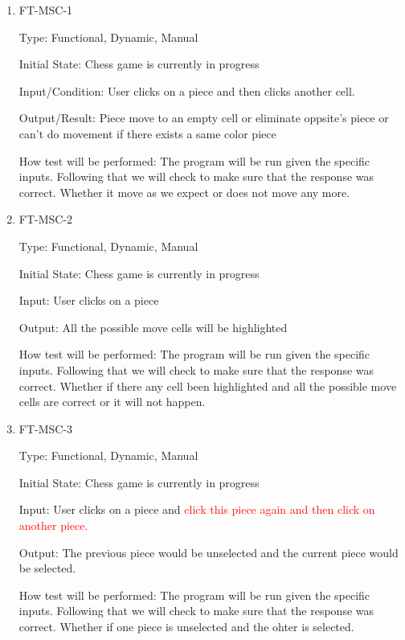 \documentclass[12pt, titlepage]{article}
\begin{document}
\begin{enumerate}

\item{FT-MSC-1\\}

Type: Functional, Dynamic, Manual
					
Initial State: Chess game is currently in progress
					
Input/Condition: User clicks on a piece and then clicks another cell.
					
Output/Result: Piece move to an empty cell or eliminate oppsite's piece or can't do movement if there exists a same color piece
					
How test will be performed: The program will be run given the specific inputs. Following that we will check to make sure that the response was correct. Whether it move as we expect or does not move any more. 
					
\item{FT-MSC-2\\}

Type: Functional, Dynamic, Manual
					
Initial State: Chess game is currently in progress
					
Input: User clicks on a piece
					
Output: All the possible move cells will be highlighted
					
How test will be performed: The program will be run given the specific inputs. Following that we will check to make sure that the response was correct. Whether if there any cell been highlighted and all the possible move cells are correct or it will not happen.

\item{FT-MSC-3\\}

Type: Functional, Dynamic, Manual
					
Initial State: Chess game is currently in progress
					
Input: User clicks on a piece and \textcolor{red}{click this piece again and then click on another piece. }
					
Output: The previous piece would be unselected and the current piece would be selected. 
					
How test will be performed: The program will be run given the specific inputs. Following that we will check to make sure that the response was correct. Whether if one piece is unselected and the ohter is selected.


\end{enumerate}
\end{document}
